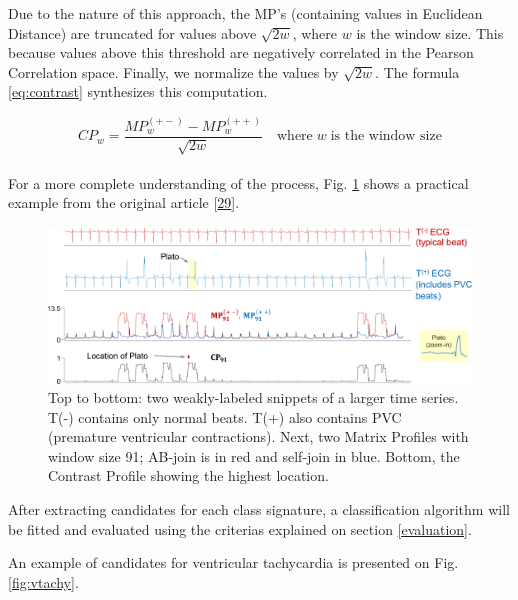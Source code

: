 \documentclass[runningheads]{llncs}
\begin{document}
Due to the nature of this approach, the MP's (containing values in Euclidean Distance) are truncated
for values above \(\sqrt{2w}\), where \(w\) is the window size. This because values above this threshold
are negatively correlated in the Pearson Correlation space. Finally, we normalize the values by
\(\sqrt{2w}\). The formula \eqref{eq:contrast} synthesizes this computation.

\hfill\break
\begin{equation}
CP_w = \frac{MP_{w}^{(+-)} - MP_{w}^{(++)}}{\sqrt{2w}} \quad \text{where}\; w \; \text{is the window size} \label{eq:contrast}
\end{equation}\\

For a more complete understanding of the process, Fig. \ref{fig:contrast} shows a practical example
from the original article {[}\protect\hyperlink{ref-Mercer2021}{29}{]}.

\hfill\break

\begin{figure}

{\centering \includegraphics[width=1\linewidth]{../../docs/figure/contrast} 

}

\caption{Top to bottom: two weakly-labeled snippets of a larger time series. T(-) contains only normal beats. T(+) also contains PVC (premature ventricular contractions). Next, two Matrix Profiles with window size 91; AB-join is in red and self-join in blue. Bottom, the Contrast Profile showing the highest location.}\label{fig:contrast}
\end{figure}

After extracting candidates for each class signature, a classification algorithm will be fitted and
evaluated using the criterias explained on section \ref{evaluation}.

An example of candidates for ventricular tachycardia is presented on Fig. \ref{fig:vtachy}.
\end{document}
